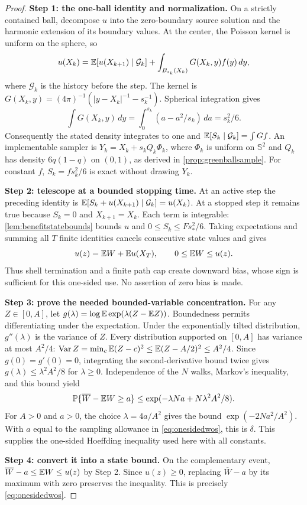 \begin{proof}
\textbf{Step 1: the one-ball identity and normalization.}
On a strictly contained ball, decompose $u$ into the zero-boundary source
solution and the harmonic extension of its boundary values. At the center,
the Poisson kernel is uniform on the sphere, so
\[
 u(X_k)=\mathbb{E}[u(X_{k+1})\mid\mathcal G_k]
      +\int_{B_{s_k}(X_k)}G(X_k,y)f(y)\,dy,
\]
where $\mathcal G_k$ is the history before the step. The kernel is
$G(X_k,y)=(4\pi)^{-1}(|y-X_k|^{-1}-s_k^{-1})$. Spherical integration gives
\[
 \int G(X_k,y)\,dy
 =\int_0^{s_k}(a-a^2/s_k)\,da=s_k^2/6.
\]
Consequently the stated density integrates to one and
$\mathbb{E}[S_k\mid\mathcal G_k]=\int Gf$.
An implementable sampler is
$Y_k=X_k+s_k Q_k\Phi_k$, where $\Phi_k$ is uniform on $\mathbb S^2$ and
$Q_k$ has density $6q(1-q)$ on $(0,1)$, as derived in
\cref{prop:greenballsample}. For constant $f$, $S_k=f s_k^2/6$ is exact
without drawing $Y_k$.

\textbf{Step 2: telescope at a bounded stopping time.}
At an active step the preceding identity is
$\mathbb{E}[S_k+u(X_{k+1})\mid\mathcal G_k]=u(X_k)$.
At a stopped step it remains true because $S_k=0$ and $X_{k+1}=X_k$.
Each term is integrable: \cref{lem:benefitstatebounds} bounds $u$ and
$0\le S_k\le Fs_*^2/6$. Taking expectations and summing all $T$ finite
identities cancels consecutive state values and gives
\begin{equation}
 u(z)=\mathbb{E} W+\mathbb{E} u(X_T),\qquad 0\le\mathbb{E} W\le u(z).
 \label{eq:truncationidentity}
\end{equation}
Thus shell termination and a finite path cap create downward bias, whose
sign is sufficient for this one-sided use. No assertion of zero bias is made.

\textbf{Step 3: prove the needed bounded-variable concentration.}
For any $Z\in[0,A]$, let
$g(\lambda)=\log\mathbb{E}\exp(\lambda(Z-\mathbb{E} Z))$.
Boundedness permits differentiating under the expectation. Under the
exponentially tilted distribution, $g''(\lambda)$ is the variance of $Z$.
Every distribution supported on $[0,A]$ has variance at most $A^2/4$:
$\operatorname{Var} Z=\min_c\mathbb{E}(Z-c)^2\le\mathbb{E}(Z-A/2)^2\le A^2/4$.
Since $g(0)=g'(0)=0$, integrating the second-derivative bound twice gives
$g(\lambda)\le\lambda^2A^2/8$ for $\lambda\ge0$.
Independence of the $N$ walks, Markov's inequality, and this bound yield
\[
 \mathbb{P}\{\overline W-\mathbb{E} W\ge a\}
 \le\exp(-\lambda Na+N\lambda^2A^2/8).
\]
For $A>0$ and $a>0$, the choice $\lambda=4a/A^2$ gives the bound
$\exp(-2Na^2/A^2)$. With $a$ equal to the sampling allowance in
\cref{eq:onesidedwos}, this is $\delta$.
This supplies the one-sided Hoeffding inequality used here with all constants.

\textbf{Step 4: convert it into a state bound.}
On the complementary event, $\overline W-a\le\mathbb{E} W\le u(z)$ by Step 2.
Since $u(z)\ge0$, replacing $\overline W-a$ by its maximum with zero
preserves the inequality. This is precisely \cref{eq:onesidedwos}.
\end{proof}

